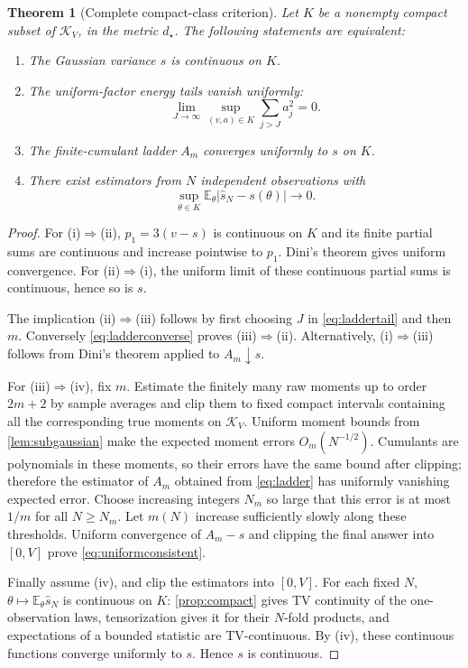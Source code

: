 \documentclass[11pt,letterpaper]{article}
\numberwithin{equation}{section}
\newtheorem{theorem}{Theorem}[section]
\theoremstyle{definition}
\theoremstyle{remark}
\newcommand{\E}{\mathbb E}
\newcommand{\K}{\mathcal K_V}
\begin{document}
\begin{theorem}[Complete compact-class criterion]
\label{thm:criterion}
Let $K$ be a nonempty compact subset of $\K$, in the metric $d_\star$.
The following statements are equivalent:
\begin{enumerate}[label=\textup{(\roman*)}]
\item The Gaussian variance $s$ is continuous on $K$.
\item The uniform-factor energy tails vanish uniformly:
\begin{equation}
 \lim_{J\to\infty}\sup_{(v,a)\in K}\sum_{j>J}a_j^2=0.
 \label{eq:tailcriterion}
\end{equation}
\item The finite-cumulant ladder $A_m$ converges uniformly to $s$ on $K$.
\item There exist estimators from $N$ independent observations with
\begin{equation}
 \sup_{\theta\in K}\E_\theta|\widehat s_N-s(\theta)|\longrightarrow0.
 \label{eq:uniformconsistent}
\end{equation}
\end{enumerate}
\end{theorem}
\begin{proof}
For (i)$\Rightarrow$(ii), $p_1=3(v-s)$ is continuous on $K$ and its finite
partial sums are continuous and increase pointwise to $p_1$. Dini's theorem
gives uniform convergence. For (ii)$\Rightarrow$(i), the uniform limit of
these continuous partial sums is continuous, hence so is $s$.

The implication (ii)$\Rightarrow$(iii) follows by first choosing $J$ in
\eqref{eq:laddertail} and then $m$. Conversely \eqref{eq:ladderconverse}
proves (iii)$\Rightarrow$(ii). Alternatively, (i)$\Rightarrow$(iii) follows
from Dini's theorem applied to $A_m\downarrow s$.

For (iii)$\Rightarrow$(iv), fix $m$. Estimate the finitely many raw moments
up to order $2m+2$ by sample averages and clip them to fixed compact intervals
containing all the corresponding true moments on $\K$. Uniform moment
bounds from \cref{lem:subgaussian} make the expected moment errors
$O_m(N^{-1/2})$. Cumulants are polynomials in these moments, so their
errors have the same bound after clipping; therefore the estimator of
$A_m$ obtained from \eqref{eq:ladder} has uniformly vanishing expected error.
Choose increasing integers $N_m$ so large that this error is at most $1/m$
for all $N\ge N_m$. Let $m(N)$ increase sufficiently slowly along these
thresholds. Uniform convergence of $A_m-s$ and clipping the final answer
into $[0,V]$ prove \eqref{eq:uniformconsistent}.

Finally assume (iv), and clip the estimators into $[0,V]$. For each fixed $N$,
$\theta\mapsto\E_\theta\widehat s_N$ is continuous on $K$:
\cref{prop:compact} gives TV continuity of the one-observation laws,
tensorization gives it for their $N$-fold products, and expectations of a
bounded statistic are TV-continuous. By (iv), these continuous functions
converge uniformly to $s$. Hence $s$ is continuous.
\end{proof}
\end{document}
